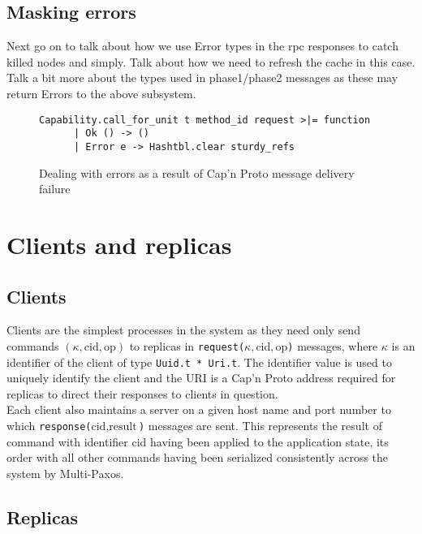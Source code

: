 \subsection{Masking errors}

{\color{red}
Next go on to talk about how we use Error types in the rpc responses to catch killed nodes and simply. Talk about how we need to refresh the cache in this case. Talk a bit more about the types used in phase1/phase2 messages as these may return Errors to the above subsystem. \\
}

\begin{figure}
  \begin{lstlisting}
Capability.call_for_unit t method_id request >|= function
      | Ok () -> ()
      | Error e -> Hashtbl.clear sturdy_refs    
  \end{lstlisting}
  \centering
  \caption{Dealing with errors as a result of Cap'n Proto message delivery failure}
  \label{fig:message-failure}
\end{figure}


\section{Clients and replicas}

\subsection{Clients}

Clients are the simplest processes in the system as they need only send commands $\left(\kappa, \textrm{cid}, \textrm{op} \right)$ to replicas in \texttt{request($\kappa, \textrm{cid}, \textrm{op}$)} messages, where $\kappa$ is an identifier of the client of type \texttt{Uuid.t * Uri.t}. The identifier value is used to uniquely identify the client and the URI is a Cap'n Proto address required for replicas to direct their responses to clients in question. \\

Each client also maintains a server on a given host name and port number to which \texttt{response($\textrm{cid}, \textrm{result}$)} messages are sent. This represents the result of command with identifier $\textrm{cid}$ having been applied to the application state, its order with all other commands having been serialized consistently across the system by Multi-Paxos.

\subsection{Replicas}

